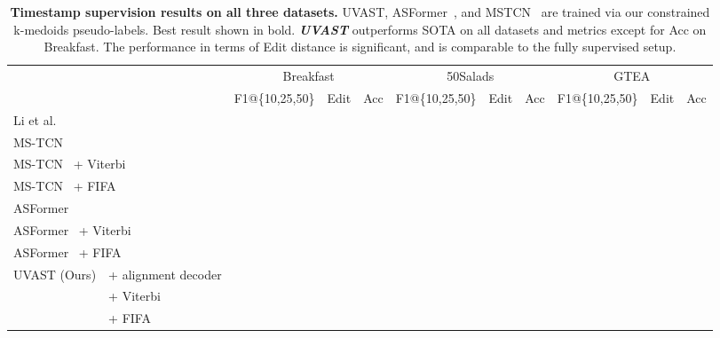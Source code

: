 \begin{table}[t!]
\begin{center}
\caption{
\textbf{Timestamp supervision results on all three datasets.}
UVAST, ASFormer~\cite{asformer}, and MSTCN~\cite{farha2019ms} are trained via our constrained k-medoids pseudo-labels. Best result shown in bold. \textbf{\textit{UVAST}} outperforms SOTA on all datasets and metrics except for Acc on Breakfast. The performance in terms of Edit distance is significant, and is comparable to the fully supervised setup.
}
\label{tab:timestamp}
\resizebox{\linewidth}{!} {
\begin{tabular}{ll|ccc|c|c||ccc|c|c||ccc|c|c}
\hline 
\hline 
\multicolumn{2}{l|}{} & \multicolumn{5}{c||}{{Breakfast}} & \multicolumn{5}{c||}{{50Salads}} & \multicolumn{5}{c}{{GTEA}}\\
\cline{3-17} 
 &  & \multicolumn{3}{c|}{{F1@\{10,25,50\}}} & Edit & Acc & \multicolumn{3}{c|}{{F1@\{10,25,50\}}} & Edit & Acc & \multicolumn{3}{c|}{{F1@\{10,25,50\}}} & Edit & Acc \\
\hline 
\multicolumn{2}{l|}{Li et al. \cite{timestamp2021}} &  &  &  &  &  &  &  &  &  &  &  &  &  &  & \\
\multicolumn{2}{l|}{MS-TCN~\cite{farha2019ms}} &  &  &  &  &  &  &  &  &  &  &  &  &  &  & \\
\multicolumn{2}{l|}{MS-TCN~\cite{farha2019ms} + Viterbi} &  &  &  &  &  &  &  &  &  &  &  &  &  &  & \\
\multicolumn{2}{l|}{MS-TCN~\cite{farha2019ms} + FIFA} &  &  &  &  &  &  &  &  &  &  &  &  &  &  &  \\
\multicolumn{2}{l|}{ASFormer~\cite{asformer}} &  &  &  &  &  &  &  &  &  &  &  &  &  &  &  \\
\multicolumn{2}{l|}{ASFormer~\cite{asformer} + Viterbi} &  &  &  &  &  &  &  &  &  &  &  &  &  &  &  \\
\multicolumn{2}{l|}{ASFormer~\cite{asformer} + FIFA} &  &  &  &  &  &  &  &  &  &  &  &  &  &  &  \\
\hline 
\multirow{3}{*}{{UVAST (Ours)}}
 & + alignment decoder &  &  &  &  &  &  &  &  &  &  &  &  &  &  & \\
 & + Viterbi &  &  &  &  &  &  &  &  &  &  &  &  &  &  & \\
 & + FIFA &  &  &  &  &  &  &  &  &  &  &  &  &  &  & \\
\hline 
\hline 
\end{tabular}    
}
\end{center}
\end{table}


